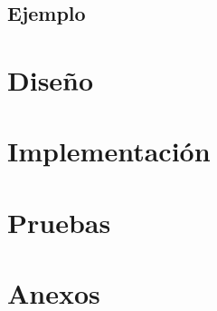 \documentclass{report}
\begin{document}
\section{Ejemplo}





\chapter{Diseño}


\chapter{Implementación}


\chapter{Pruebas}


\chapter{Anexos}
\end{document}
